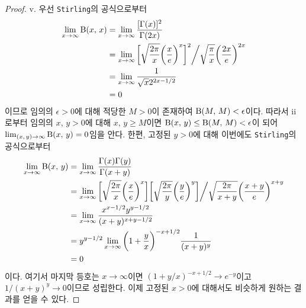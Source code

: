 \begin{proof}
    v. 우선 \texttt{Stirling}의 공식으로부터
    \begin{align*}
        \lim_{x\to\infty}\mathrm{B}(x,\,x)&=\lim_{x\to\infty}\frac{[\Gamma(x)]^2}{\Gamma(2x)}\\
        &=\lim_{x\to\infty}\bigg[\sqrt{\frac{2\pi}{x}}\bigg(\frac{x}{e}\bigg)^x\bigg]^2\bigg/\sqrt{\frac{\pi}{x}}\bigg(\frac{2x}{e}\bigg)^{2x}\\
        &=\lim_{x\to\infty}\frac{1}{\sqrt{x}2^{2x-1/2}}\\
        &=0
    \end{align*}
    이므로 임의의 $\epsilon>0$에 대해 적당한 $M>0$이 존재하여 $\mathrm{B}(M,\,M)<\epsilon$이다. 따라서 ii로부터 임의의 $x,\,y>0$에 대해 $x,\,y\geq M$이면 $\mathrm{B}(x,\,y)\leq\mathrm{B}(M,\,M)<\epsilon$이 되어 $\lim_{(x,\,y)\to\infty}\mathrm{B}(x,\,y)=0$임을 안다. 한편, 고정된 $y>0$에 대해 이번에도 \texttt{Stirling}의 공식으로부터
    \begin{align*}
        \lim_{x\to\infty}\mathrm{B}(x,\,y)&=\lim_{x\to\infty}\frac{\Gamma(x)\Gamma(y)}{\Gamma(x+y)}\\
        &=\lim_{x\to\infty}\bigg[\sqrt{\frac{2\pi}{x}}\bigg(\frac{x}{e}\bigg)^x\bigg]\bigg[\sqrt{\frac{2\pi}{y}}\bigg(\frac{y}{e}\bigg)^y\bigg]\bigg/\sqrt{\frac{2\pi}{x+y}}\bigg(\frac{x+y}{e}\bigg)^{x+y}\\
        &=\lim_{x\to\infty}\frac{x^{x-1/2}y^{y-1/2}}{(x+y)^{x+y-1/2}}\\
        &=y^{y-1/2}\lim_{x\to\infty}\bigg(1+\frac{y}{x}\bigg)^{-x+1/2}\frac{1}{(x+y)^y}\\
        &=0
    \end{align*}
    이다. 여기서 마지막 등호는 $x\to\infty$이면 $(1+y/x)^{-x+1/2}\to e^{-y}$이고 $1/(x+y)^y\to0$이므로 성립한다. 이제 고정된 $x>0$에 대해서도 비슷하게 원하는 결과를 얻을 수 있다. 


\end{proof}

